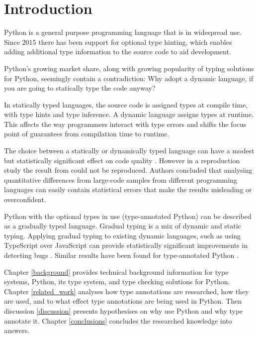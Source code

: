\chapter{Introduction\label{intro}}

Python is a general purpose programming language that is in widespread use. Since 2015 there has been support for optional type hinting, which enables adding additional type information to the source code to aid development.

Python's growing market share, along with growing popularity of typing solutions for Python, seemingly contain a contradiction: Why adopt a dynamic language, if you are going to statically type the code anyway?

In statically typed languages, the source code is assigned types at compile time, with type hints and type inference. A dynamic language assigns types at runtime. This affects the way programmers interact with type errors and shifts the focus point of guarantees from compilation time to runtime.

The choice between a statically or dynamically typed language can have a modest but statistically significant effect on code quality \cite{nanz_comparative_2015, ray_codequality_2014}. However in a reproduction study \cite{codequality_reproudction_2019} the result from \cite{ray_codequality_2014} could not be reproduced. Authors concluded that analysing quantitative differences from large-code samples from different programming languages can easily contain statistical errors that make the results misleading or overconfident.

Python with the optional types in use (type-annotated Python) can be described as a gradually typed language. Gradual typing is a mix of dynamic and static typing. Applying gradual typing to existing dynamic languages, such as using TypeScript over JavaScript can provide statistically significant improvements in detecting bugs \cite{gao_to_type_or_not_2017}. Similar results have been found for type-annotated Python \cite{khan_empirical_2022, rak-amnouykit_taleoftwo_2020}.

Chapter \ref{background} provides technical background information for type systems, Python, its type system, and type checking solutions for Python. Chapter \ref{related_work} analyses how type annotations are researched, how they are used, and to what effect type annotations are being used in Python. Then discussion \ref{discussion} presents hypothesises on why use Python and why type annotate it. Chapter \ref{conclusions} concludes the researched knowledge into answers.

